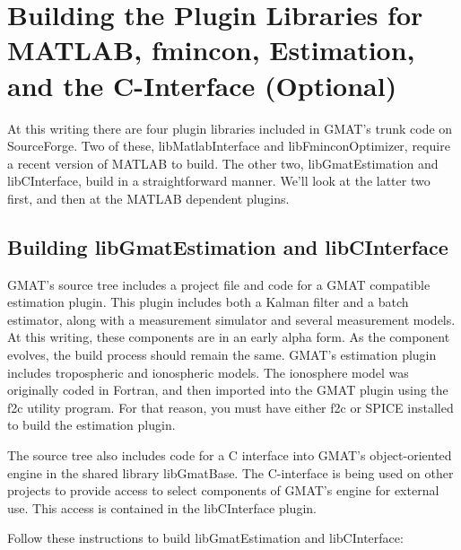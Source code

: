 \documentclass[letterpaper,10pt]{article}%
\begin{document}
\section{Building the Plugin Libraries for MATLAB, fmincon, Estimation, and the C-Interface (Optional)}

At this writing there are four plugin libraries included in GMAT's trunk code on SourceForge.  Two of these, libMatlabInterface and libFminconOptimizer, require a recent version of MATLAB to build.  The other two, libGmatEstimation and libCInterface, build in a straightforward manner.  We'll look at the latter two first, and then at the MATLAB dependent plugins.

\subsection{Building libGmatEstimation and libCInterface}

GMAT's source tree includes a project file and code for a GMAT compatible estimation plugin.  This plugin includes both a Kalman filter and a batch estimator, along with a measurement simulator and several measurement models.  At this writing, these components are in an early alpha form.  As the component evolves, the build process should remain the same.  GMAT's estimation plugin includes tropospheric and ionospheric models.  The ionosphere model was originally coded in Fortran, and then imported into the GMAT plugin using the f2c utility program.  For that reason, you must have either f2c or SPICE installed to build the estimation plugin.

The source tree also includes code for a C interface into GMAT's object-oriented engine in the shared library libGmatBase.  The C-interface is being used on other projects to provide access to select components of GMAT's engine for external use.  This access is contained in the libCInterface plugin.

Follow these instructions to build libGmatEstimation and libCInterface:
 
\end{document}
